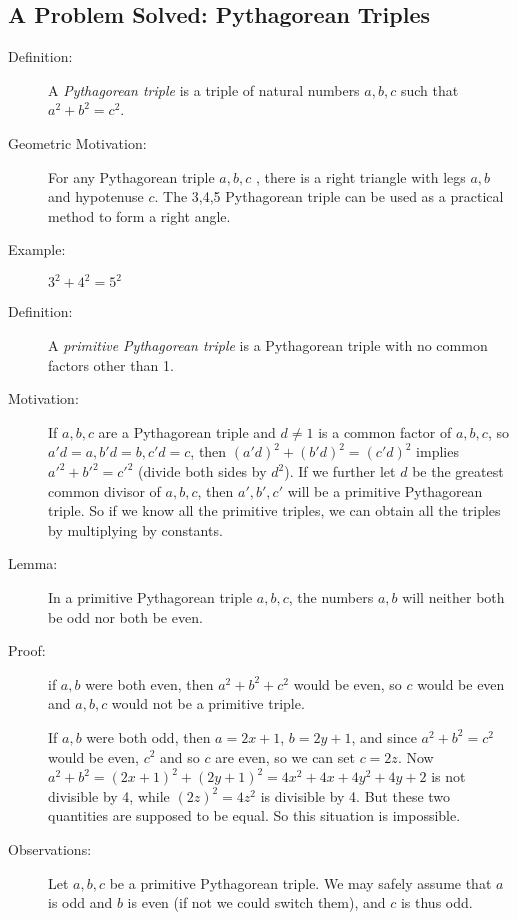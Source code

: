 \documentclass[12pt]{article}
\begin{document}
\subsection{A Problem Solved:  Pythagorean Triples}

\begin{description}

\item[Definition:]   A {\em Pythagorean triple\/} is a triple of natural numbers $a,b,c$ such that $a^2+b^2=c^2$.

\item[Geometric Motivation:]   For any Pythagorean triple $a,b,c$ , there is a right triangle with legs $a,b$  and hypotenuse $c$.  The 3,4,5 Pythagorean triple can be used as a practical method to form a right angle.

\item[Example:]  $3^2+4^2=5^2$

\item[Definition:]  A {\em primitive Pythagorean triple\/} is a Pythagorean triple with no common factors other than 1.

\item[Motivation:]  If $a,b,c$ are a Pythagorean triple and $d \neq 1$ is a common factor of $a,b,c$,
so $a'd=a, b'd=b, c'd=c$, then $(a'd)^2 + (b'd)^2 = (c'd)^2$ implies $a'^2+b'^2=c'^2$ (divide both sides by
$d^2$).   If we further let $d$ be the greatest common divisor of $a,b,c$, then $a',b',c'$ will be a primitive Pythagorean triple.   So if we know all the primitive triples, we can obtain all the triples by multiplying by constants.

\item[Lemma:]  In a primitive Pythagorean triple $a,b,c$, the numbers $a,b$ will neither both be odd nor both be even.

\item[Proof:]  if $a,b$ were both even, then $a^2+b^2+c^2$ would be even, so $c$ would be even and
$a,b,c$ would not be a primitive triple.

If $a,b$ were both odd, then $a=2x+1$, $b=2y+1$, and since $a^2+b^2=c^2$ would be even, $c^2$ and so $c$
are even, so we can set $c=2z$.   Now $a^2+b^2=(2x+1)^2+(2y+1)^2 = 4x^2+4x+4y^2+4y+2$ is not divisible by 4, while $(2z)^2= 4z^2$ is divisible by 4.  But these two quantities are supposed to be equal.  So this situation is impossible.

\item[Observations:]  Let $a,b,c$ be a primitive Pythagorean triple.   We may safely assume that $a$ is odd and $b$ is even (if not we could switch them), and $c$ is thus odd.


\end{description}
\end{document}
